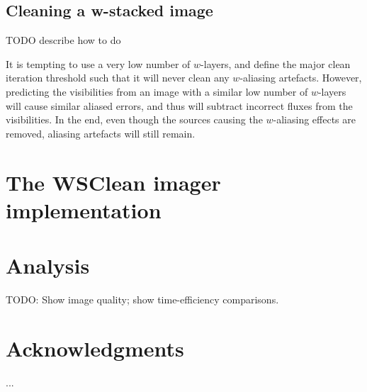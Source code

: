 \documentclass[useAMS,usenatbib]{mn2e}
\DeclareRobustCommand{\TUSSEN}[3]{#2}
\begin{document}
\subsection{Cleaning a w-stacked image}
TODO describe how to do

It is tempting to use a very low number of $w$-layers, and define the major clean iteration threshold such that it will never clean any $w$-aliasing artefacts. However, predicting the visibilities from an image with a similar low number of $w$-layers will cause similar aliased errors, and thus will subtract incorrect fluxes from the visibilities. In the end, even though the sources causing the $w$-aliasing effects are removed, aliasing artefacts will still remain.

\section{The WSClean imager implementation}

\section{Analysis}
TODO: Show image quality; show time-efficiency comparisons.

\section*{Acknowledgments}
...

\DeclareRobustCommand{\TUSSEN}[3]{#3}




\label{lastpage}
\end{document}
